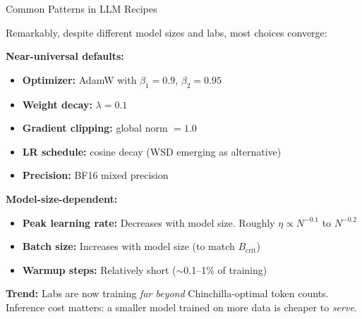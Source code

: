 \begin{frame}{Common Patterns in LLM Recipes}

  Remarkably, despite different model sizes and labs, most choices converge:

  \vspace{0.4em}
  \textbf{Near-universal defaults:}
  \begin{itemize}
    \item \textbf{Optimizer:} AdamW with $\beta_1 = 0.9$, $\beta_2 = 0.95$
    \item \textbf{Weight decay:} $\lambda = 0.1$
    \item \textbf{Gradient clipping:} global norm $= 1.0$
    \item \textbf{LR schedule:} cosine decay (WSD emerging as alternative)
    \item \textbf{Precision:} BF16 mixed precision
  \end{itemize}

  \vspace{0.4em}
  \textbf{Model-size-dependent:}
  \begin{itemize}
    \item \textbf{Peak learning rate:} Decreases with model size. Roughly $\eta \propto N^{-0.1}$ to $N^{-0.2}$
    \item \textbf{Batch size:} Increases with model size (to match $B_{\text{crit}}$)
    \item \textbf{Warmup steps:} Relatively short ($\sim$0.1--1\% of training)
  \end{itemize}

  \vspace{0.4em}
  \textbf{Trend:} Labs are now training \emph{far beyond} Chinchilla-optimal token counts.
  Inference cost matters: a smaller model trained on more data is cheaper to \emph{serve}.
\end{frame}

